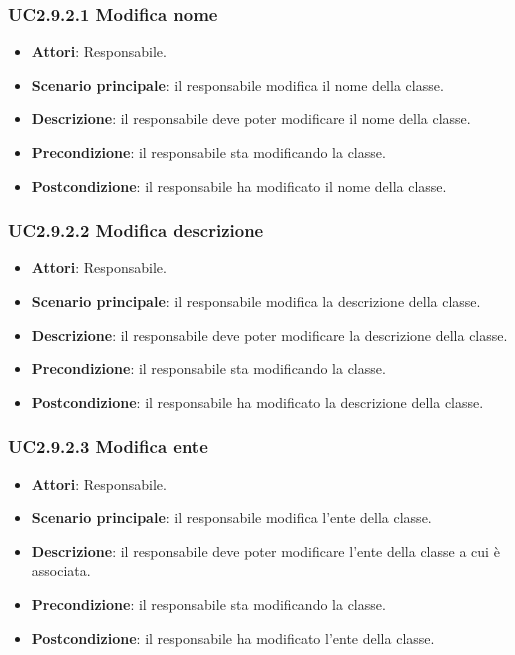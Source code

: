 \subsubsection{UC2.9.2.1 Modifica nome}
\begin{itemize}
\item \textbf{Attori}: Responsabile.
\item \textbf{Scenario principale}: il responsabile modifica il nome della classe.
\item \textbf{Descrizione}: il responsabile deve poter modificare il nome della classe.
\item \textbf{Precondizione}: il responsabile sta modificando la classe.
\item \textbf{Postcondizione}: il responsabile ha modificato il nome della classe.
\end{itemize}
\subsubsection{UC2.9.2.2 Modifica descrizione}
\begin{itemize}
\item \textbf{Attori}: Responsabile.
\item \textbf{Scenario principale}: il responsabile modifica la descrizione della classe.
\item \textbf{Descrizione}: il responsabile deve poter modificare la descrizione della classe.
\item \textbf{Precondizione}: il responsabile sta modificando la classe.
\item \textbf{Postcondizione}: il responsabile ha modificato la descrizione della classe.
\end{itemize}
\subsubsection{UC2.9.2.3 Modifica ente}
\begin{itemize}
\item \textbf{Attori}: Responsabile.
\item \textbf{Scenario principale}: il responsabile modifica l'ente della classe.
\item \textbf{Descrizione}: il responsabile deve poter modificare l'ente della classe a cui è associata.
\item \textbf{Precondizione}: il responsabile sta modificando la classe.
\item \textbf{Postcondizione}: il responsabile ha modificato l'ente della classe.
\end{itemize}

